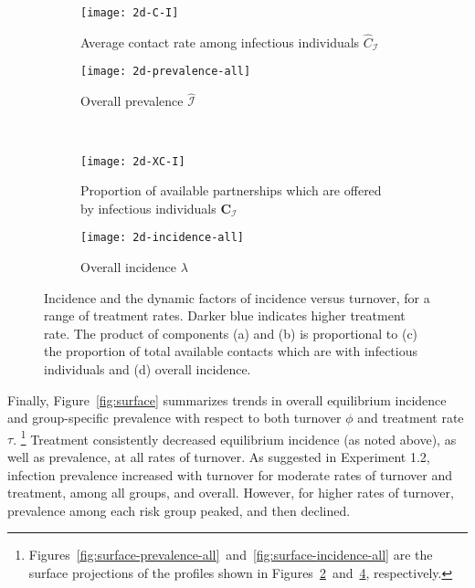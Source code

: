 \begin{figure}[!tbp]
  \centering
  \begin{subfigure}[t]{0.45\linewidth}
    \centering
    \texttt{[image: 2d-C-I]}
    \caption{Average contact rate among infectious individuals $\hat{C}_{\mathcal{I}}$}
    \label{fig:2d-C-I}
  \end{subfigure}
  \begin{subfigure}[t]{0.45\linewidth}
    \centering
    \texttt{[image: 2d-prevalence-all]}
    \caption{Overall prevalence $\hat{\mathcal{I}}$}
    \label{fig:2d-prevalence-all}
  \end{subfigure}\\[1em]
  \begin{subfigure}[t]{0.45\linewidth}
    \centering
    \texttt{[image: 2d-XC-I]}
    \caption{Proportion of available partnerships
      which are offered by infectious individuals $\bm{C}_{\mathcal{I}}$}
    \label{fig:2d-XC-I}
  \end{subfigure}
  \begin{subfigure}[t]{0.45\linewidth}
    \centering
    \texttt{[image: 2d-incidence-all]}
    \caption{Overall incidence $\lambda$}
    \label{fig:2d-incidence-all}
  \end{subfigure}
  \caption{Incidence and the dynamic factors of incidence versus turnover,
    for a range of treatment rates.
    Darker blue indicates higher treatment rate.
    The product of components (a) and (b) is proportional to
    (c) the proportion of total available contacts which are with infectious individuals
    and (d) overall incidence.}
  \label{fig:2d-incidence-factors}
\end{figure}
\par
Finally, Figure~\ref{fig:surface} summarizes trends in
overall equilibrium incidence and group-specific prevalence
with respect to both turnover $\phi$ and treatment rate $\tau$.%
\footnote{Figures~\ref{fig:surface-prevalence-all}~and~\ref{fig:surface-incidence-all}
  are the surface projections of the profiles shown in
  Figures~\ref{fig:2d-prevalence-all}~and~\ref{fig:2d-incidence-all}, respectively.}
Treatment consistently decreased equilibrium incidence (as noted above),
as well as prevalence, at all rates of turnover.
As suggested in Experiment 1.2, infection prevalence increased with turnover
for moderate rates of turnover and treatment, among all groups, and overall.
However, for higher rates of turnover,
prevalence among each risk group peaked, and then declined.
